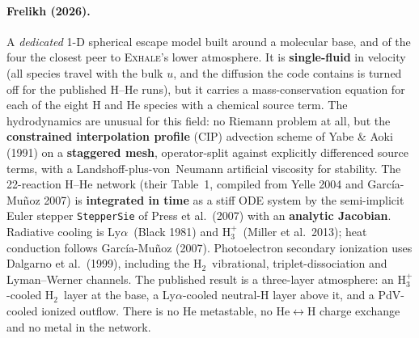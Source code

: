 \documentclass[english,a4paper]{my_memo}
\newcommand{\EXHALE}{\textsc{Exhale}}
\newcommand{\Lya}{Ly$\alpha$}
\newcommand{\Hth}{\ensuremath{\mathrm{H}_3^+}}
\newcommand{\Htwo}{\ensuremath{\mathrm{H}_2}}
\begin{document}
\paragraph{Frelikh (2026).} A \emph{dedicated} 1-D spherical escape model
built around a molecular base, and of the four the closest peer to \EXHALE's
lower atmosphere. It is \textbf{single-fluid} in velocity (all species
travel with the bulk $u$, and the diffusion the code contains is turned off
for the published H--He runs), but it carries a mass-conservation equation
for each of the eight H and He species with a chemical source term. The
hydrodynamics are unusual for this field: no Riemann problem at all, but the
\textbf{constrained interpolation profile} (CIP) advection scheme of Yabe \&
Aoki (1991) on a \textbf{staggered mesh}, operator-split against explicitly
differenced source terms, with a Landshoff-plus-von~Neumann artificial
viscosity for stability. The 22-reaction H--He network (their Table~1,
compiled from Yelle 2004 and Garc\'ia-Mu\~noz 2007) is \textbf{integrated in
time} as a stiff ODE system by the semi-implicit Euler stepper
\texttt{StepperSie} of Press et al.\ (2007) with an \textbf{analytic
Jacobian}. Radiative cooling is \Lya\ (Black 1981) and \Hth\ (Miller et al.\
2013); heat conduction follows Garc\'ia-Mu\~noz (2007). Photoelectron
secondary ionization uses Dalgarno et al.\ (1999), including the \Htwo\
vibrational, triplet-dissociation and Lyman--Werner channels. The published
result is a three-layer atmosphere: an \Hth-cooled \Htwo\ layer at the base, a
\Lya-cooled neutral-H layer above it, and a PdV-cooled ionized outflow. There
is no He metastable, no He$\leftrightarrow$H charge exchange and no metal in
the network.
\end{document}
